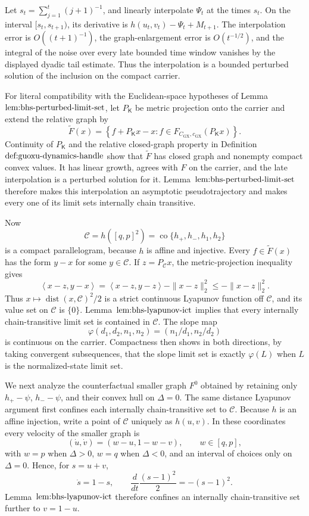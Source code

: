 Let \(s_t=\sum_{j=1}^t(j+1)^{-1}\), and linearly interpolate \(\Psi_t\) at the times \(s_t\).  On the interval \([s_t,s_{t+1})\), its derivative is \(h(u_t,v_t)-\Psi_t+M_{t+1}\).  The interpolation error is \(O((t+1)^{-1})\), the graph-enlargement error is \(O(t^{-1/2})\), and the integral of the noise over every late bounded time window vanishes by the displayed dyadic tail estimate.  Thus the interpolation is a bounded perturbed solution of the inclusion on the compact carrier.

For literal compatibility with the Euclidean-space hypotheses of Lemma~\(\textnormal{lem:bhs-perturbed-limit-set}\), let \(P_{\mathsf K}\) be metric projection onto the carrier and extend the relative graph by
\[
 \widetilde F(x)=
 \left\{f+P_{\mathsf K}x-x:f\in
 F_{C_{\mathrm{GX}},c_{\mathrm{GX}}}(P_{\mathsf K}x)\right\}.
\]
Continuity of \(P_{\mathsf K}\) and the relative closed-graph property in Definition~\(\textnormal{def:guoxu-dynamics-handle}\) show that \(\widetilde F\) has closed graph and nonempty compact convex values.  It has linear growth, agrees with \(F\) on the carrier, and the late interpolation is a perturbed solution for it.  Lemma~\(\textnormal{lem:bhs-perturbed-limit-set}\) therefore makes this interpolation an asymptotic pseudotrajectory and makes every one of its limit sets internally chain transitive.

Now
\[
 \mathcal C=h([q,p]^2)
 =\operatorname{co}\{h_+,h_-,h_1,h_2\}
\]
is a compact parallelogram, because \(h\) is affine and injective.  Every \(f\in\widetilde F(x)\) has the form \(y-x\) for some \(y\in\mathcal C\).  If \(z=P_{\mathcal C}x\), the metric-projection inequality gives
\[
 \left\langle x-z,y-x\right\rangle
 =\left\langle x-z,y-z\right\rangle-\|x-z\|_2^2
 \le-\|x-z\|_2^2.
\]
Thus \(x\mapsto\operatorname{dist}(x,\mathcal C)^2/2\) is a strict continuous Lyapunov function off \(\mathcal C\), and its value set on \(\mathcal C\) is \(\{0\}\).  Lemma~\(\textnormal{lem:bhs-lyapunov-ict}\) implies that every internally chain-transitive limit set is contained in \(\mathcal C\).  The slope map
\[
 \varphi(d_1,d_2,n_1,n_2)=(n_1/d_1,n_2/d_2)
\]
is continuous on the carrier.  Compactness then shows in both directions, by taking convergent subsequences, that the slope limit set is exactly \(\varphi(L)\) when \(L\) is the normalized-state limit set.

We next analyze the counterfactual smaller graph \(F^0\) obtained by retaining only \(h_+-\psi\), \(h_--\psi\), and their convex hull on \(\Delta=0\).  The same distance Lyapunov argument first confines each internally chain-transitive set to \(\mathcal C\).  Because \(h\) is an affine injection, write a point of \(\mathcal C\) uniquely as \(h(u,v)\).  In these coordinates every velocity of the smaller graph is
\[
 (\dot u,\dot v)=(w-u,1-w-v),\qquad w\in[q,p],
\]
with \(w=p\) when \(\Delta>0\), \(w=q\) when \(\Delta<0\), and an interval of choices only on \(\Delta=0\).  Hence, for \(s=u+v\),
\[
 \dot s=1-s,
 \qquad
 \frac{d}{dt}\frac{(s-1)^2}{2}=-(s-1)^2.
\]
Lemma~\(\textnormal{lem:bhs-lyapunov-ict}\) therefore confines an internally chain-transitive set further to \(v=1-u\).

